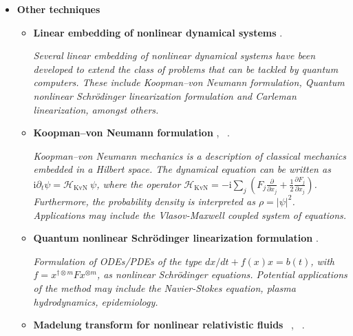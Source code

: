 \documentclass[12pt,letterpaper]{article}
\begin{document}
\begin{itemize}
\begin{itemize}
   \end{itemize}

    \item \textbf{Other techniques}
    \begin{itemize} 
                
        \item \textbf{Linear embedding of nonlinear dynamical systems}   \cite{engelLinearEmbeddingNonlinear2021,jinTimeComplexityAnalysis2022}  \cite{liuEfficientQuantumAlgorithm2021}.

        \textit{Several linear embedding of nonlinear dynamical systems have been developed to extend the class of problems that can be tackled by quantum computers. These include Koopman–von Neumann formulation, Quantum nonlinear Schrödinger linearization formulation and Carleman linearization, amongst others.}
        
        \item \textbf{Koopman–von Neumann formulation}   \cite{josephKoopmanNeumannApproach2020,jinTimeComplexityAnalysis2022}, ~\cite{linKoopmanNeumannMechanics2022}.

        \textit{Koopman–von Neumann mechanics is a description of classical mechanics embedded in a Hilbert space. The dynamical equation can be written as $\mathrm{i} \partial_t \psi=\mathcal{H}_{\mathrm{KvN}}~ \psi $, where the operator $\mathcal{H}_{\mathrm{KvN}}=-\mathrm{i} \sum_j\left(F_j \frac{\partial}{\partial x_j}+\frac{1}{2} \frac{\partial F_j}{\partial x_j}\right)$. Furthermore, the probability density is interpreted as  $\rho = |\psi|^2$. Applications may include the Vlasov-Maxwell coupled system of equations.}
            
        \item \textbf{Quantum nonlinear Schrödinger linearization formulation}   \cite{lloydQuantumAlgorithmNonlinear2020}.

        \textit{Formulation of ODEs/PDEs of the type $ dx/dt +f(x) x = b(t) $, with $f = x^{\dagger \otimes m} F x^{\otimes m}$, as nonlinear Schrödinger equations. Potential applications of the method may include the Navier-Stokes equation, plasma hydrodynamics, epidemiology.}
    
        \item \textbf{Madelung transform for nonlinear relativistic fluids} ~\cite{hatifiQuantumWalkHydrodynamics2019},  ~\cite{zylbermanHybridQuantumClassicalAlgorithm2022}.


\end{itemize}
\end{itemize}
\end{document}
